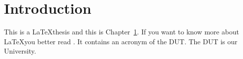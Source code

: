     \chapter{Introduction} \label{chap:intro}

    This is a \LaTeX thesis and this is Chapter\ \ref{chap:intro}.
    If you want to know more about \LaTeX you better read
    \cite{texbook}.  It contains an acronym
    of the \ac{DUT}. The \ac{DUT} is our University.

    \cleardoublepage
